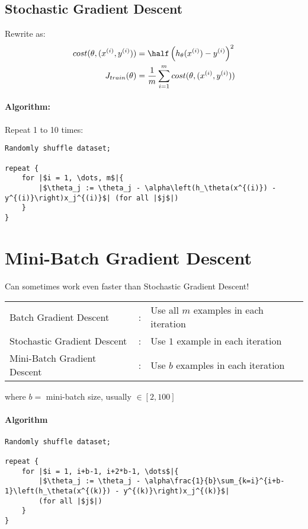 \subsection{Stochastic Gradient Descent}
Rewrite as:
\begin{align*}
	{cost}(\theta, (x^{(i)}, y^{(i)})) ={} & \half \left(
	h_\theta(x^{(i)}) - y^{(i)}
	\right)^2                                                        \\
	J_{train}(\theta) ={}                  & \frac{1}{m}\sum_{i=1}^m
	{cost}(\theta, (x^{(i)}, y^{(i)}))                               \\
\end{align*}
\paragraph{Algorithm:}
Repeat 1 to 10 times:
\begin{verbatim}
Randomly shuffle dataset;

repeat {
	for |$i = 1, \dots, m$|{
		|$\theta_j := \theta_j - \alpha\left(h_\theta(x^{(i)}) - y^{(i)}\right)x_j^{(i)}$| (for all |$j$|)
	}
}
\end{verbatim}

\section{Mini-Batch Gradient Descent}
Can sometimes work even faster than Stochastic Gradient Descent!

\begin{tabularx}{0.9\linewidth}{l c X}
	Batch Gradient Descent      & : &
	Use all $m$ examples in each iteration \\
	Stochastic Gradient Descent & : &
	Use $1$ example in each iteration      \\
	Mini-Batch Gradient Descent & : &
	Use $b$ examples in each iteration     \\
\end{tabularx}

where $b = $ mini-batch size, usually $\in [2, 100]$

\paragraph{Algorithm}
\begin{verbatim}
Randomly shuffle dataset;

repeat {
	for |$i = 1, i+b-1, i+2*b-1, \dots$|{
		|$\theta_j := \theta_j - \alpha\frac{1}{b}\sum_{k=i}^{i+b-1}\left(h_\theta(x^{(k)}) - y^{(k)}\right)x_j^{(k)}$| 
		(for all |$j$|)
	}
}
\end{verbatim}

